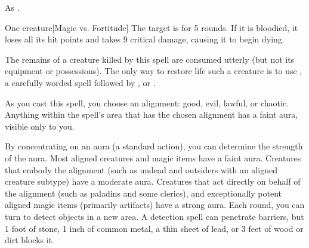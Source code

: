 \spellnotes As .

\spellrng{\rngclose}
\begin{spelltarget}{One creature}[Magic vs. Fortitude]
    \spellsuccess The target is \staggered for 5 rounds. If it is bloodied, it loses all its hit points and takes 9 critical damage, causing it to begin dying.
\end{spelltarget}
\spellnotes The remains of a creature killed by this spell are consumed utterly (but not its equipment or possessions). The only way to restore life such a creature is to use , a carefully worded  spell followed by , or .

\spellline
\spelleffect As you cast this spell, you choose an alignment: good, evil, lawful, or chaotic. Anything within the spell's area that has the chosen alignment has a faint aura, visible only to you.

By concentrating on an aura (a standard action), you can determine the strength of the aura. Most aligned creatures and magic items have a faint aura. Creatures that embody the alignment (such as undead and outsiders with an aligned creature subtype) have a moderate aura. Creatures that act directly on behalf of the alignment (such as paladins and some clerics), and exceptionally potent aligned magic items (primarily artifacts) have a strong aura.
\spellnotes Each round, you can turn to detect objects in a new area. A detection spell can penetrate barriers, but 1 foot of stone, 1 inch of common metal, a thin sheet of lead, or 3 feet of wood or dirt blocks it.

